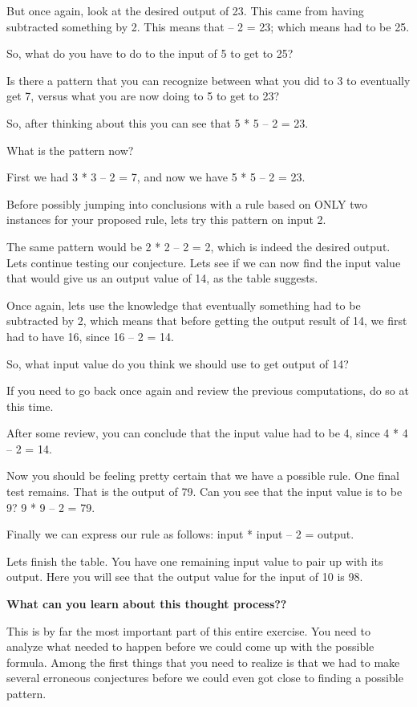 \documentclass{article}
\begin{document}
But once again, look at the desired output of 23. This came from having subtracted something by 2. This means that \underline{\phantom{x}}– 2 = 23; which means \underline{\phantom{x}} had to be 25.

So, what do you have to do to the input of 5 to get to 25?

Is there a pattern that you can recognize between what you did to 3 to eventually get 7, versus what you are now doing to 5 to get to 23?

So, after thinking about this you can see that 5 * 5 – 2 = 23.

What is the pattern now?

First we had 3 * 3 – 2 = 7, and now we have 5 * 5 – 2 = 23.

Before possibly jumping into conclusions with a rule based on ONLY two instances for your
proposed rule, lets try this pattern on input 2.

The same pattern would be 2 * 2 – 2 = 2, which is indeed the desired output.
Lets continue testing our conjecture. Lets see if we can now find the input value that would give us an output value of 14, as the table suggests.

Once again, lets use the knowledge that eventually something had to be subtracted by 2, which means that before getting the output result of 14, we first had to have 16, since 16 – 2 = 14.

So, what input value do you think we should use to get output of 14?

If you need to go back once again and review the previous computations, do so at this time.

After some review, you can conclude that the input value had to be 4, since 4 * 4 – 2 = 14.

Now you should be feeling pretty certain that we have a possible rule. One final test remains. That is the output of 79. Can you see that the input value is to be 9? 9 * 9 – 2 = 79.

Finally we can express our rule as follows: input * input – 2 = output.

Lets finish the table. You have one remaining input value to pair up with its output. Here you will see that the output value for the input of 10 is 98.

\textbf{What can you learn about this thought process??}

This is by far the most important part of this entire exercise. You
need to analyze what needed to happen before we could come up with the
possible formula. Among the first things that you need to realize is
that we had to make several erroneous conjectures before we could even
got close to finding a possible pattern.
\end{document}
